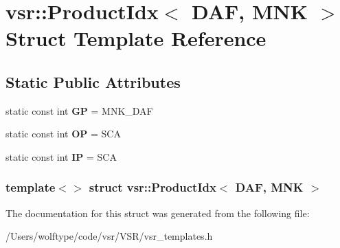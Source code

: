 \hypertarget{structvsr_1_1_product_idx_3_01_d_a_f_00_01_m_n_k_01_4}{\section{vsr\-:\-:Product\-Idx$<$ D\-A\-F, M\-N\-K $>$ Struct Template Reference}
\label{structvsr_1_1_product_idx_3_01_d_a_f_00_01_m_n_k_01_4}
}
\subsection*{Static Public Attributes}
\begin{DoxyCompactItemize}
\item 
\hypertarget{structvsr_1_1_product_idx_3_01_d_a_f_00_01_m_n_k_01_4_a85003e4b3a28e164072c31eadff61a49}{static const int {\bfseries G\-P} = M\-N\-K\-\_\-\-D\-A\-F}\label{structvsr_1_1_product_idx_3_01_d_a_f_00_01_m_n_k_01_4_a85003e4b3a28e164072c31eadff61a49}

\item 
\hypertarget{structvsr_1_1_product_idx_3_01_d_a_f_00_01_m_n_k_01_4_a513c216a610c6c9bb6463c6808ffb12f}{static const int {\bfseries O\-P} = S\-C\-A}\label{structvsr_1_1_product_idx_3_01_d_a_f_00_01_m_n_k_01_4_a513c216a610c6c9bb6463c6808ffb12f}

\item 
\hypertarget{structvsr_1_1_product_idx_3_01_d_a_f_00_01_m_n_k_01_4_a332a6921048f809fd9e9dda4397907e7}{static const int {\bfseries I\-P} = S\-C\-A}\label{structvsr_1_1_product_idx_3_01_d_a_f_00_01_m_n_k_01_4_a332a6921048f809fd9e9dda4397907e7}

\end{DoxyCompactItemize}
\subsubsection*{template$<$$>$ struct vsr\-::\-Product\-Idx$<$ D\-A\-F, M\-N\-K $>$}



The documentation for this struct was generated from the following file\-:\begin{DoxyCompactItemize}
\item 
/\-Users/wolftype/code/vsr/\-V\-S\-R/vsr\-\_\-templates.\-h\end{DoxyCompactItemize}
